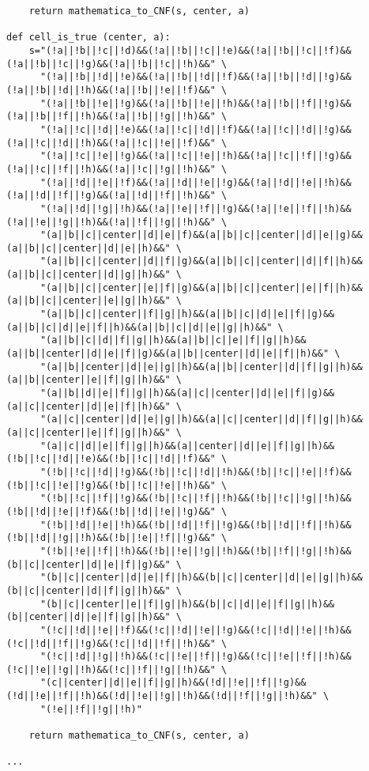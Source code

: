 \begin{lstlisting}
    return mathematica_to_CNF(s, center, a)

def cell_is_true (center, a):
    s="(!a||!b||!c||!d)&&(!a||!b||!c||!e)&&(!a||!b||!c||!f)&&(!a||!b||!c||!g)&&(!a||!b||!c||!h)&&" \
      "(!a||!b||!d||!e)&&(!a||!b||!d||!f)&&(!a||!b||!d||!g)&&(!a||!b||!d||!h)&&(!a||!b||!e||!f)&&" \
      "(!a||!b||!e||!g)&&(!a||!b||!e||!h)&&(!a||!b||!f||!g)&&(!a||!b||!f||!h)&&(!a||!b||!g||!h)&&" \
      "(!a||!c||!d||!e)&&(!a||!c||!d||!f)&&(!a||!c||!d||!g)&&(!a||!c||!d||!h)&&(!a||!c||!e||!f)&&" \
      "(!a||!c||!e||!g)&&(!a||!c||!e||!h)&&(!a||!c||!f||!g)&&(!a||!c||!f||!h)&&(!a||!c||!g||!h)&&" \
      "(!a||!d||!e||!f)&&(!a||!d||!e||!g)&&(!a||!d||!e||!h)&&(!a||!d||!f||!g)&&(!a||!d||!f||!h)&&" \
      "(!a||!d||!g||!h)&&(!a||!e||!f||!g)&&(!a||!e||!f||!h)&&(!a||!e||!g||!h)&&(!a||!f||!g||!h)&&" \
      "(a||b||c||center||d||e||f)&&(a||b||c||center||d||e||g)&&(a||b||c||center||d||e||h)&&" \
      "(a||b||c||center||d||f||g)&&(a||b||c||center||d||f||h)&&(a||b||c||center||d||g||h)&&" \
      "(a||b||c||center||e||f||g)&&(a||b||c||center||e||f||h)&&(a||b||c||center||e||g||h)&&" \
      "(a||b||c||center||f||g||h)&&(a||b||c||d||e||f||g)&&(a||b||c||d||e||f||h)&&(a||b||c||d||e||g||h)&&" \
      "(a||b||c||d||f||g||h)&&(a||b||c||e||f||g||h)&&(a||b||center||d||e||f||g)&&(a||b||center||d||e||f||h)&&" \
      "(a||b||center||d||e||g||h)&&(a||b||center||d||f||g||h)&&(a||b||center||e||f||g||h)&&" \
      "(a||b||d||e||f||g||h)&&(a||c||center||d||e||f||g)&&(a||c||center||d||e||f||h)&&" \
      "(a||c||center||d||e||g||h)&&(a||c||center||d||f||g||h)&&(a||c||center||e||f||g||h)&&" \
      "(a||c||d||e||f||g||h)&&(a||center||d||e||f||g||h)&&(!b||!c||!d||!e)&&(!b||!c||!d||!f)&&" \
      "(!b||!c||!d||!g)&&(!b||!c||!d||!h)&&(!b||!c||!e||!f)&&(!b||!c||!e||!g)&&(!b||!c||!e||!h)&&" \
      "(!b||!c||!f||!g)&&(!b||!c||!f||!h)&&(!b||!c||!g||!h)&&(!b||!d||!e||!f)&&(!b||!d||!e||!g)&&" \
      "(!b||!d||!e||!h)&&(!b||!d||!f||!g)&&(!b||!d||!f||!h)&&(!b||!d||!g||!h)&&(!b||!e||!f||!g)&&" \
      "(!b||!e||!f||!h)&&(!b||!e||!g||!h)&&(!b||!f||!g||!h)&&(b||c||center||d||e||f||g)&&" \
      "(b||c||center||d||e||f||h)&&(b||c||center||d||e||g||h)&&(b||c||center||d||f||g||h)&&" \
      "(b||c||center||e||f||g||h)&&(b||c||d||e||f||g||h)&&(b||center||d||e||f||g||h)&&" \
      "(!c||!d||!e||!f)&&(!c||!d||!e||!g)&&(!c||!d||!e||!h)&&(!c||!d||!f||!g)&&(!c||!d||!f||!h)&&" \
      "(!c||!d||!g||!h)&&(!c||!e||!f||!g)&&(!c||!e||!f||!h)&&(!c||!e||!g||!h)&&(!c||!f||!g||!h)&&" \
      "(c||center||d||e||f||g||h)&&(!d||!e||!f||!g)&&(!d||!e||!f||!h)&&(!d||!e||!g||!h)&&(!d||!f||!g||!h)&&" \
      "(!e||!f||!g||!h)"

    return mathematica_to_CNF(s, center, a)

...
\end{lstlisting}

